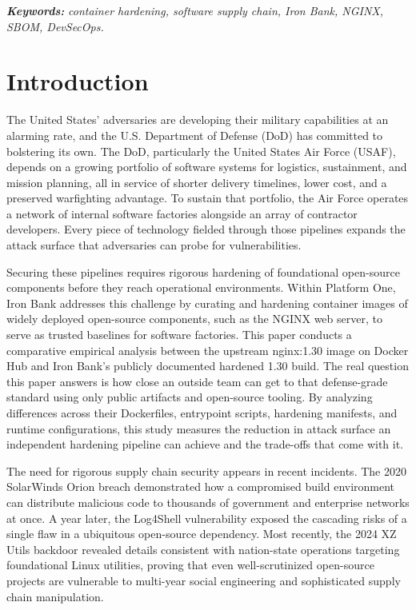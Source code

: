 \documentclass[10pt,letterpaper,twocolumn]{article}
\begin{document}
\medskip
\noindent\textbf{\textit{Keywords:}} \textit{container hardening, software supply chain, Iron Bank, NGINX, SBOM, DevSecOps.}

\section{Introduction}

The United States' adversaries are developing their military capabilities at an alarming rate, and the U.S. Department of Defense (DoD) has committed to bolstering its own. The DoD, particularly the United States Air Force (USAF), depends on a growing portfolio of software systems for logistics, sustainment, and mission planning, all in service of shorter delivery timelines, lower cost, and a preserved warfighting advantage. To sustain that portfolio, the Air Force operates a network of internal software factories alongside an array of contractor developers. Every piece of technology fielded through those pipelines expands the attack surface that adversaries can probe for vulnerabilities.

Securing these pipelines requires rigorous hardening of foundational open-source components before they reach operational environments. Within Platform One, Iron Bank addresses this challenge by curating and hardening container images of widely deployed open-source components, such as the NGINX web server, to serve as trusted baselines for software factories. This paper conducts a comparative empirical analysis between the upstream nginx:1.30 image on Docker Hub and Iron Bank's publicly documented hardened 1.30 build. The real question this paper answers is how close an outside team can get to that defense-grade standard using only public artifacts and open-source tooling. By analyzing differences across their Dockerfiles, entrypoint scripts, hardening manifests, and runtime configurations, this study measures the reduction in attack surface an independent hardening pipeline can achieve and the trade-offs that come with it.

The need for rigorous supply chain security appears in recent incidents. The 2020 SolarWinds Orion breach demonstrated how a compromised build environment can distribute malicious code to thousands of government and enterprise networks at once. A year later, the Log4Shell vulnerability exposed the cascading risks of a single flaw in a ubiquitous open-source dependency. Most recently, the 2024 XZ Utils backdoor revealed details consistent with nation-state operations targeting foundational Linux utilities, proving that even well-scrutinized open-source projects are vulnerable to multi-year social engineering and sophisticated supply chain manipulation.
\end{document}
